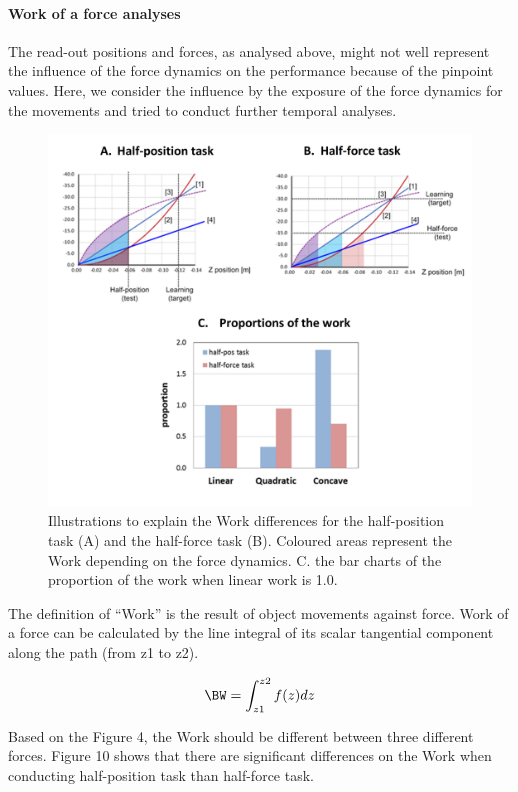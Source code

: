 \paragraph{Work of a force analyses}
The read-out positions and forces, as analysed above, might not well represent the influence of the force dynamics on the performance because of the pinpoint values. Here, we consider the influence by the exposure of the force dynamics for the movements and tried to conduct further temporal analyses.
%
\begin{figure}
  \centering
  \includegraphics[scale=0.5]{Chie/figs/Figure10.png}
  \caption{Illustrations to explain the Work differences for the half-position task (A) and the half-force task (B). Coloured areas represent the Work depending on the force dynamics. C. the bar charts of the proportion of the work when linear work is 1.0. }
  \label{work}
\end{figure}
The definition of “Work” is the result of object movements against force. Work of a force can be calculated by the line integral of its scalar tangential component along the path (from z1 to z2).

%
\begin{equation}
  \BW = \int_{z1}^{z2} f(z) dz
\end{equation}
%

Based on the Figure 4, the Work should be different between three different forces.
Figure 10 shows that there are significant differences on the Work when conducting half-position task than half-force task.

